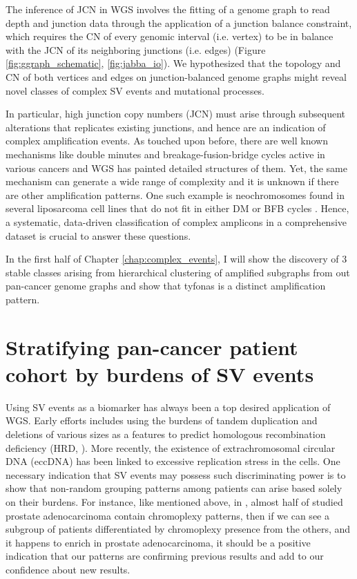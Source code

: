 \documentclass[phd,tocprelim]{cornell}
\begin{document}
The inference of JCN in WGS involves the fitting of a genome graph to read depth and junction data through the application of a junction balance constraint, which requires the CN of every genomic interval (i.e. vertex) to be in balance with the JCN of its neighboring junctions (i.e. edges) (Figure \ref{fig:ggraph_schematic}, \ref{fig:jabba_io})\cite{Medvedev:2010bm, Greenman:2012eg, Oesper2012-vw, Li2016-qa, Dzamba2017-wo, McPherson2017-ry}. We hypothesized that the topology and CN of both vertices and edges on junction-balanced genome graphs might reveal novel classes of complex SV events and mutational processes. 

In particular, high junction copy numbers (JCN) must arise through subsequent alterations that replicates existing junctions, and hence are an indication of complex amplification events. As touched upon before, there are well known mechanisms like double minutes and breakage-fusion-bridge cycles active in various cancers and WGS has painted detailed structures of them. Yet, the same mechanism can generate a wide range of complexity \cite{Deshpande2019-gs} and it is unknown if there are other amplification patterns. One such example is neochromosomes found in several liposarcoma cell lines that do not fit in either DM or BFB cycles \cite{garsed2014}. Hence, a systematic, data-driven classification of complex amplicons in a comprehensive dataset is crucial to answer these questions.

In the first half of Chapter \ref{chap:complex_events}, I will show the discovery of 3 stable classes arising from hierarchical clustering of amplified subgraphs from out pan-cancer genome graphs and show that tyfonas is a distinct amplification pattern.

\section{Stratifying pan-cancer patient cohort by burdens of SV events}
Using SV events as a biomarker has always been a top desired application of WGS. Early efforts includes using the burdens of tandem duplication and deletions of various sizes as a features to predict homologous recombination deficiency (HRD, \cite{Davies:2017642}). More recently, the existence of extrachromosomal circular DNA (eccDNA) has been linked to excessive replication stress in the cells. One necessary indication that SV events may possess such discriminating power is to show that non-random grouping patterns among patients can arise based solely on their burdens. For instance, like mentioned above, in \cite{baca2013}, almost half of studied prostate adenocarcinoma contain chromoplexy patterns, then if we can see a subgroup of patients differentiated by chromoplexy presence from the others, and it happens to enrich in prostate adenocarcinoma, it should be a positive indication that our patterns are confirming previous results and add to our confidence about new results.
\end{document}
